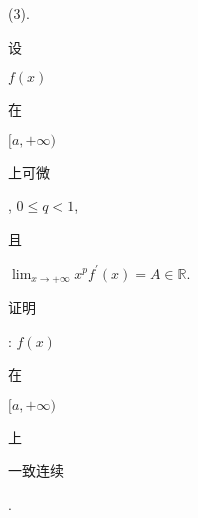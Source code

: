 \documentclass[10pt]{article}
\begin{document}
(3). \begin{CJK}{UTF8}{mj}设\end{CJK} $f(x)$ \begin{CJK}{UTF8}{mj}在\end{CJK} $[a,+\infty)$ \begin{CJK}{UTF8}{mj}上可微\end{CJK}, $0 \leqslant q<1$, \begin{CJK}{UTF8}{mj}且\end{CJK} $\lim _{x \rightarrow+\infty} x^{p} f^{\prime}(x)=A \in \mathbb{R}$. \begin{CJK}{UTF8}{mj}证明\end{CJK}: $f(x)$ \begin{CJK}{UTF8}{mj}在\end{CJK} $[a,+\infty)$ \begin{CJK}{UTF8}{mj}上\end{CJK} \begin{CJK}{UTF8}{mj}一致连续\end{CJK}.
\end{document}
